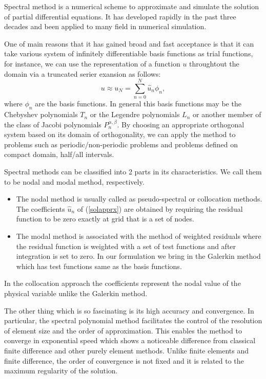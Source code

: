 

Spectral method is a numerical scheme to approximate and simulate
the solution of partial differential equations. It has developed
rapidly in the past three decades and been applied to many field
in numerical simulation.

One of main reasons that it has gained broad and fast acceptance
is that it can take various system of infinitely differentiable
basis functions as trial functions, for instance, we can use the
representation of a function $u$ throughtout the domain via a
truncated serier exansion as follows:
\begin{equation}
\label{solapprx}
u \approx u_N = \sum_{n=0}^{N} \hat u_n \phi_n,
\end{equation}
where $\phi_n$ are the basis functions. In general this basis
functions may be the Chebyshev polynomials $T_n$ or the Legendre
polynomials $L_n$ or another member of the class of Jacobi
polynomials $P_n^{\alpha, \beta}$. By choosing an appropriate
orthogonal system based on its domain of orthogonality, we can
apply the method to problems such as periodic/non-periodic
problems and problems defined on compact domain, half/all
intervals.


Spectral methods can be classified into 2 parts in its
characteristics. We call them to be nodal and modal method,
respectively.
\begin{itemize}
\item The nodal method is usually called as pseudo-spectral or
collocation methods. The coefficients $\hat u_n$ of
(\ref{solapprx}) are obtained by requiring  the residual function
to be zero exactly at grid that is a set of nodes.

\item The modal method is associated with the method of weighted
residuals where the residual function is weighted with a set of
test functions and after integration is set to zero. In our
formulation we bring in the Galerkin method which has test
functions same as the basis functions.
\end{itemize}

In the collocation approach the coefficients represent the nodal
value of the physical variable unlike the Galerkin method.

The other thing which is so fascinating is its high accuracy and
convergence. In particular, the spectral polynomial method
facilitates the control of the resolution of element size and the
order of approximation. This enables the method to converge in
exponential speed which shows a noticeable difference from
classical finite difference and other purely element methods.
Unlike finite elements and finite difference, the order of
convergence is not fixed and it is related to the maximum
regularity of the solution.

